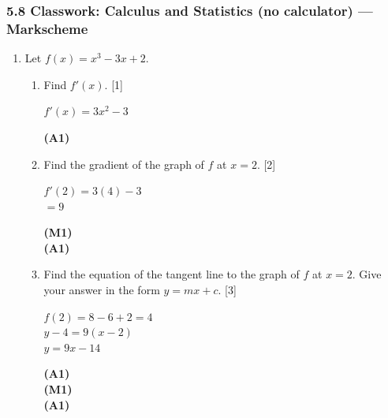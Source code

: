 \documentclass[12pt, twoside]{article}
\begin{document}
\subsubsection*{5.8 Classwork: Calculus and Statistics (no calculator) --- Markscheme}

\begin{enumerate}[itemsep=0.2cm]

\item Let $f(x) = x^3 - 3x + 2$.

\begin{enumerate}[itemsep=0.3cm]
  \item Find $f'(x)$. \hfill [1]

  \begin{minipage}[t]{0.62\textwidth}
  $f'(x) = 3x^2 - 3$
  \end{minipage}%
  \begin{minipage}[t]{0.35\textwidth}\raggedleft
  \textbf{(A1)}
  \end{minipage}

  \medskip
  \item Find the gradient of the graph of $f$ at $x = 2$. \hfill [2]

  \begin{minipage}[t]{0.62\textwidth}
  $f'(2) = 3(4) - 3$\\[0.15cm]
  $= 9$
  \end{minipage}%
  \begin{minipage}[t]{0.35\textwidth}\raggedleft
  \textbf{(M1)}\\[0.15cm]
  \textbf{(A1)}
  \end{minipage}

  \medskip
  \item Find the equation of the tangent line to the graph of $f$ at $x = 2$.
        Give your answer in the form $y = mx + c$. \hfill [3]

  \begin{minipage}[t]{0.62\textwidth}
  $f(2) = 8 - 6 + 2 = 4$\\[0.15cm]
  $y - 4 = 9(x - 2)$\\[0.15cm]
  $y = 9x - 14$
  \end{minipage}%
  \begin{minipage}[t]{0.35\textwidth}\raggedleft
  \textbf{(A1)}\\[0.15cm]
  \textbf{(M1)}\\[0.15cm]
  \textbf{(A1)}
  \end{minipage}


\end{enumerate}
\end{enumerate}
\end{document}

